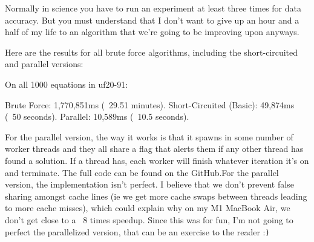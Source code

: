 Normally in science you have to run an experiment at least three times for
data accuracy. But you must understand that I don't want to give up an hour
and a half of my life to an algorithm that we're going to be improving upon
anyways.

Here are the results for all brute force algorithms, including the short-circuited 
and parallel versions:

\begin{FVerbatim}
On all 1000 equations in uf20-91:

Brute Force:               1,770,851ms (~29.51 minutes).
Short-Circuited (Basic):   49,874ms (~50 seconds).
Parallel:                  10,589ms (~10.5 seconds).
\end{FVerbatim}

For the parallel version, the way it works is that it spawns in some number of 
worker threads and they all share a flag that alerts them if any other thread has 
found a solution. If a thread has, each worker will finish whatever iteration it's 
on and terminate. The full code can be found on the GitHub.For the parallel version, the 
implementation isn't perfect. I believe that we don't prevent false sharing amongst cache 
lines (ie we get more cache swaps between threads leading to more cache misses), which could 
explain why on my M1 MacBook Air, we don't get close to a ~8 times speedup. Since this was for 
fun, I'm not going to perfect the parallelized version, that can be an exercise to the reader :\verb|)|